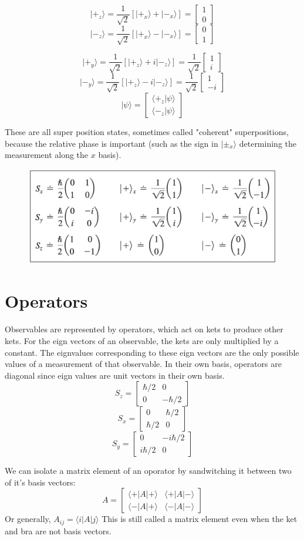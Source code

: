 \documentclass{homework}
\newcommand{\m}[1]{\begin{bmatrix} #1 \end{bmatrix}}
\newcommand{\kt}{\rangle}
\newcommand{\br}{\langle}
\begin{document}
\[| +_z \kt = \frac{1}{\sqrt{2}}[|+_x \kt + |-_x \kt] =  \m{ 1\\ 0}\]
\[| -_z \kt = \frac{1}{\sqrt{2}}[|+_x \kt - |-_x \kt] = \m{ 0\\ 1}\]

\[| +_y \kt = \frac{1}{\sqrt{2}}[|+_z \kt + i|-_z \kt] = \frac{1}{\sqrt{2}} \m{ 1\\ i}\]
\[| -_y \kt = \frac{1}{\sqrt{2}}[|+_z  \kt - i|-_z \kt] = \frac{1}{\sqrt{2}} \m{ 1\\ -i}\]
\[| \psi  \kt = \m{\br +_z|\psi \kt \\ \br -_z|\psi \kt}\]

These are all super position states, sometimes called "coherent" superpositions, because the relative phase is important (such as the sign in $| \pm_x \kt$ determining the measurement along the $x$ basis).


\begin{figure}[htp]
    \centering
    \includegraphics[width=12cm]{mreps.png}
   

\end{figure}
\section{Operators}

Observables are represented by operators, which act on kets to produce other kets. For the eign vectors of an observable, the kets are only multiplied by a constant. The eignvalues corresponding to these eign vectors are the only possible values of a measurement of that observable.
In their own basis, operators are diagonal since eign values are unit vectors in their own basis.
\[S_z = \m{\hbar/2 & 0 \\ 0 & -\hbar/2}\]
\[S_x = \m{  0 & \hbar/2 \\ \hbar/2 & 0}\]
\[S_y = \m{ 0 & -i\hbar/2\\ i\hbar/2 & 0 }\]



We can isolate a matrix element of an oporator by sandwitching it between two of it's basis vectors:
\[A = \m{\br + | A | + \kt & \br + | A | - \kt \\ \br - | A | + \kt & \br - | A | - \kt}\]
Or generally, $A_{ij} = \br i | A | j \kt$
This is still called a matrix element even when the ket and bra are not basis vectors.
\end{document}
